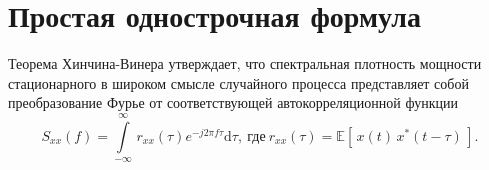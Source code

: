 \documentclass{article}
\begin{document}
\section{Простая однострочная формула}

Теорема Хинчина-Винера утверждает, что спектральная плотность мощности стационарного в широком смысле случайного процесса представляет собой преобразование Фурье от соответствующей автокорреляционной функции
\begin{equation*}
    S_{xx}(f) = \int\limits_{-\infty}^{\infty}  \, r_{xx} (\tau) e^{-j 2 \pi f \tau} \mathrm{d} \tau,\ \text{где}\ r_{xx}(\tau) = \mathbb{E}[\,x(t) \, x^{*}(t - \tau)\,].
\end{equation*}
\end{document}
